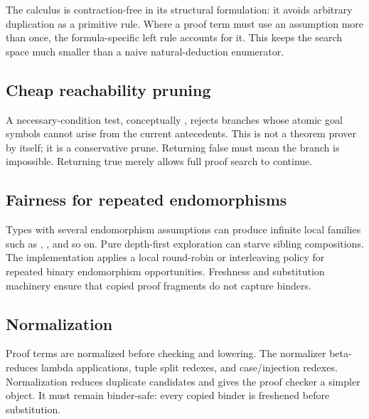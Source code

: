 \documentclass[10pt,letterpaper,oneside]{report}
\newcommand{\code}[1]{\texttt{\detokenize{#1}}}
\begin{document}
The calculus is contraction-free in its structural formulation: it avoids arbitrary duplication as a primitive rule. Where a proof term must use an assumption more than once, the formula-specific left rule accounts for it. This keeps the search space much smaller than a naive natural-deduction enumerator.

\subsection{Cheap reachability pruning}

A necessary-condition test, conceptually \code{goalMayBeReachable}, rejects branches whose atomic goal symbols cannot arise from the current antecedents. This is not a theorem prover by itself; it is a conservative prune. Returning false must mean the branch is impossible. Returning true merely allows full proof search to continue.

\subsection{Fairness for repeated endomorphisms}

Types with several endomorphism assumptions can produce infinite local families such as \code{f x}, \code{f (f x)}, and so on. Pure depth-first exploration can starve sibling compositions. The implementation applies a local round-robin or interleaving policy for repeated binary endomorphism opportunities. Freshness and substitution machinery ensure that copied proof fragments do not capture binders.

\subsection{Normalization}

Proof terms are normalized before checking and lowering. The normalizer beta-reduces lambda applications, tuple split redexes, and case/injection redexes. Normalization reduces duplicate candidates and gives the proof checker a simpler object. It must remain binder-safe: every copied binder is freshened before substitution.
\end{document}
